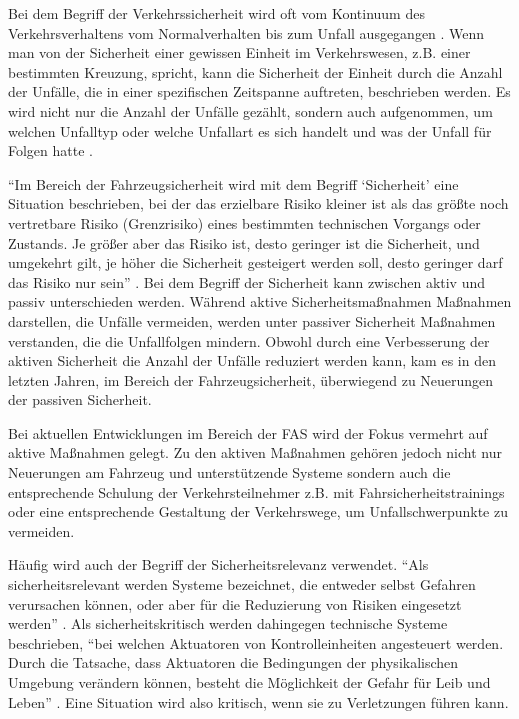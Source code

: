 Bei dem Begriff der Verkehrssicherheit wird oft vom Kontinuum des Verkehrsverhaltens vom Normalverhalten bis zum Unfall ausgegangen \parencite[S. 9]{Hoffmann.26.04.2013}. Wenn man von der Sicherheit einer gewissen Einheit im Verkehrswesen, z.B. einer bestimmten Kreuzung, spricht, kann die Sicherheit der Einheit durch die Anzahl der Unfälle, die in einer spezifischen Zeitspanne auftreten, beschrieben werden. Es wird nicht nur die Anzahl der Unfälle gezählt, sondern auch aufgenommen, um welchen Unfalltyp oder welche Unfallart es sich handelt und was der Unfall für Folgen hatte \parencite[S. 3]{Antoniou.21.06.2018}.

\enquote{Im Bereich der Fahrzeugsicherheit wird mit dem Begriff \enquote{Sicherheit} eine Situation beschrieben, bei der das erzielbare Risiko kleiner ist als das größte noch vertretbare Risiko (Grenzrisiko) eines bestimmten technischen Vorgangs oder Zustands. Je größer aber das Risiko ist, desto geringer ist die Sicherheit, und umgekehrt gilt, je höher die Sicherheit gesteigert werden soll, desto geringer darf das Risiko nur sein} \parencite[S. 743]{Burg.2017}. Bei dem Begriff der Sicherheit kann zwischen aktiv und passiv unterschieden werden. Während aktive Sicherheitsmaßnahmen Maßnahmen darstellen, die Unfälle vermeiden, werden unter passiver Sicherheit Maßnahmen verstanden, die die Unfallfolgen mindern. Obwohl durch eine Verbesserung der aktiven Sicherheit die Anzahl der Unfälle reduziert werden kann, kam es in den letzten Jahren, im Bereich der Fahrzeugsicherheit, überwiegend zu Neuerungen der passiven Sicherheit.

Bei aktuellen Entwicklungen im Bereich der \acs{FAS} wird der Fokus vermehrt auf aktive Maßnahmen gelegt. Zu den aktiven Maßnahmen gehören jedoch nicht nur Neuerungen am Fahrzeug und unterstützende Systeme sondern auch die entsprechende Schulung der Verkehrsteilnehmer z.B. mit Fahrsicherheitstrainings oder eine entsprechende Gestaltung der Verkehrswege, um Unfallschwerpunkte zu vermeiden.

Häufig wird auch der Begriff der Sicherheitsrelevanz verwendet. \enquote{Als sicherheitsrelevant werden Systeme bezeichnet, die entweder selbst Gefahren verursachen können, oder aber für die Reduzierung von Risiken eingesetzt werden} \parencite[S. 44]{Hillenbrand.2012}. Als sicherheitskritisch werden dahingegen technische Systeme beschrieben, \enquote{bei welchen Aktuatoren von Kontrolleinheiten angesteuert werden. Durch die Tatsache, dass Aktuatoren die Bedingungen der physikalischen Umgebung verändern können, besteht die Möglichkeit der Gefahr für Leib und Leben} \parencite[S. 44]{Hillenbrand.2012}. Eine Situation wird also kritisch, wenn sie zu Verletzungen führen kann.

